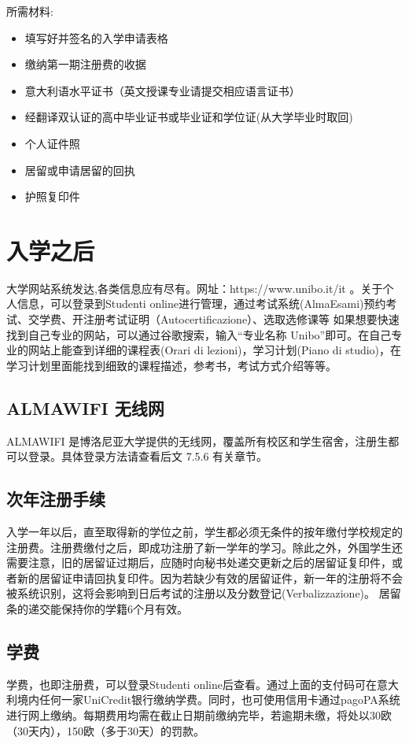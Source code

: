 所需材料:
\begin{itemize}
\item 填写好并签名的入学申请表格 
\item 缴纳第一期注册费的收据
\item 意大利语水平证书（英文授课专业请提交相应语言证书）
\item 经翻译双认证的高中毕业证书或毕业证和学位证(从大学毕业时取回)
\item 个人证件照
\item 居留或申请居留的回执
\item 护照复印件
\end{itemize}


\section{入学之后}
大学网站系统发达,各类信息应有尽有。网址：https://www.unibo.it/it 。关于个人信息，可以登录到Studenti online进行管理，通过考试系统(AlmaEsami)预约考试、交学费、开注册考试证明（Autocertificazione）、选取选修课等
如果想要快速找到自己专业的网站，可以通过谷歌搜索，输入“专业名称 Unibo”即可。在自己专业的网站上能查到详细的课程表(Orari di lezioni)，学习计划(Piano di studio)，在学习计划里面能找到细致的课程描述，参考书，考试方式介绍等等。

\subsection{ALMAWIFI 无线网}
ALMAWIFI 是博洛尼亚大学提供的无线网，覆盖所有校区和学生宿舍，注册生都可以登录。具体登录方法请查看后文 7.5.6 有关章节。

\subsection{次年注册手续}
入学一年以后，直至取得新的学位之前，学生都必须无条件的按年缴付学校规定的注册费。注册费缴付之后，即成功注册了新一学年的学习。除此之外，外国学生还需要注意，旧的居留证过期后，应随时向秘书处递交更新之后的居留证复印件，或者新的居留证申请回执复印件。因为若缺少有效的居留证件，新一年的注册将不会被系统识别，这将会影响到日后考试的注册以及分数登记(Verbalizzazione)。 居留条的递交能保持你的学籍6个月有效。

\subsection{学费}
学费，也即注册费，可以登录Studenti online后查看。通过上面的支付码可在意大利境内任何一家UniCredit银行缴纳学费。同时，也可使用信用卡通过pagoPA系统进行网上缴纳。每期费用均需在截止日期前缴纳完毕，若逾期未缴，将处以30欧（30天内），150欧（多于30天）的罚款。 

